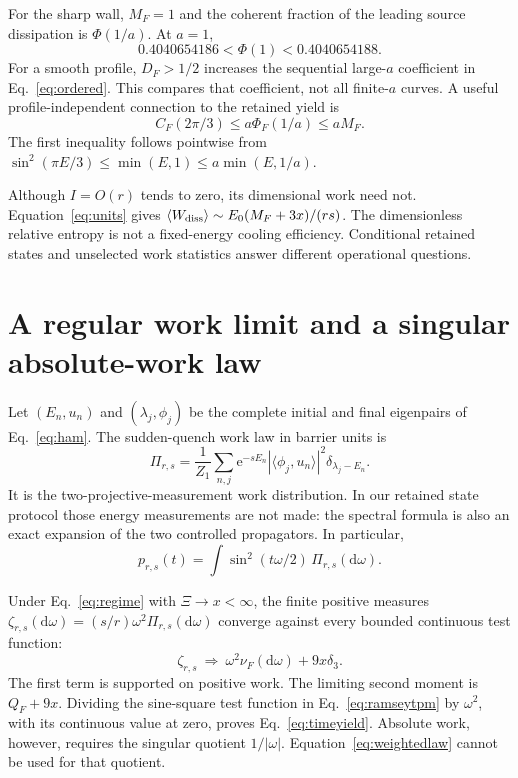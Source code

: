 \documentclass[aps,pra,reprint,superscriptaddress,longbibliography]{revtex4-2}
\newcommand{\dd}{\mathrm d}
\newcommand{\ee}{\mathrm e}
\newcommand{\ip}[2]{\langle#1,#2\rangle}
\begin{document}
For the sharp wall, $M_F=1$ and the coherent fraction of the leading
source dissipation is $\Phi(1/a)$. At $a=1$,
\begin{equation}
             0.4040654186<\Phi(1)<0.4040654188.                \label{eq:phinumeric}
\end{equation}
For a smooth profile, $D_F>1/2$ increases the sequential large-$a$
coefficient in Eq.~\eqref{eq:ordered}. This compares that coefficient,
not all finite-$a$ curves. A useful profile-independent connection to
the retained yield is
\begin{equation}
          C_F(2\pi/3)\le a\Phi_F(1/a)\le aM_F.               \label{eq:yieldcoherence}
\end{equation}
The first inequality follows pointwise from
$\sin^2(\pi E/3)\le\min(E,1)\le a\min(E,1/a)$.

Although $I=O(r)$ tends to zero, its dimensional work need not.
Equation~\eqref{eq:units} gives
$\langle W_{\rm diss}\rangle\sim E_0(M_F+3x)/(rs)$.
The dimensionless relative entropy is not a fixed-energy cooling
efficiency. Conditional retained states and unselected work statistics
answer different operational questions.

\section{A regular work limit and a singular absolute-work law}
\label{sec:work}

Let $(E_n,u_n)$ and $(\lambda_j,\phi_j)$ be the complete initial and
final eigenpairs of Eq.~\eqref{eq:ham}. The sudden-quench work law in
barrier units is
\begin{equation}
 \Pi_{r,s}=\frac1{Z_1}\sum_{n,j}\ee^{-sE_n}
        |\ip{\phi_j}{u_n}|^2\delta_{\lambda_j-E_n}.            \label{eq:tpm}
\end{equation}
It is the two-projective-measurement work distribution. In our retained
state protocol those energy measurements are not made: the spectral
formula is also an exact expansion of the two controlled propagators.
In particular,
\begin{equation}
       p_{r,s}(t)=\int\sin^2(t\omega/2)\,\Pi_{r,s}(\dd\omega).
                                                               \label{eq:ramseytpm}
\end{equation}

Under Eq.~\eqref{eq:regime} with $\Xi\to x<\infty$, the finite positive
measures $\zeta_{r,s}(\dd\omega)=(s/r)\omega^2\Pi_{r,s}(\dd\omega)$
converge against every bounded continuous test function:
\begin{equation}
 \zeta_{r,s}\ \Longrightarrow\ 
       \omega^2\nu_F(\dd\omega)+9x\delta_3.                  \label{eq:weightedlaw}
\end{equation}
The first term is supported on positive work. The limiting second
moment is $Q_F+9x$. Dividing the sine-square test function in
Eq.~\eqref{eq:ramseytpm} by $\omega^2$, with its continuous value at
zero, proves Eq.~\eqref{eq:timeyield}. Absolute work, however, requires
the singular quotient $1/|\omega|$. Equation~\eqref{eq:weightedlaw}
cannot be used for that quotient.
\end{document}
